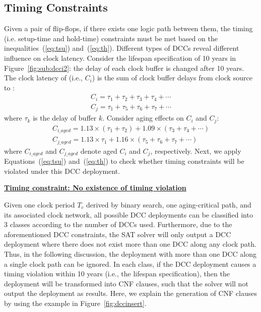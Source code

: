 \subsection{Timing Constraints}
\label{subsec:tccc}
Given a pair of flip-flops, if there exists one logic path between them, the timing (i.e. setup-time and hold-time) constraints must be met based on the inequalities~(\ref{eq:tsu}) and~(\ref{eq:th}). Different types of DCCs reveal different influence on clock latency. Consider the lifespan specification of 10 years in Figure~\ref{fig:sub:dcci2}: the delay of each clock buffer is changed after 10 years. The clock latency of  (i.e., $C_i$) is the sum of clock buffer delays from clock source to : 
\begin{gather*}
C_i = \tau_1 + \tau_2 + \tau_3 + \tau_4 +\dotsb \\
C_j = \tau_1 + \tau_5 + \tau_6 + \tau_7 +\dotsb
\end{gather*}
where $\tau_k$ is the delay of buffer $k$. Consider aging effects on $C_i$ and $C_j$: 
\begin{gather*}
C_{i\_aged} = 1.13 \times \left(\tau_1 + \tau_2\right) + 1.09 \times \left(\tau_3 + \tau_4 + \dotsb\right)\\
C_{j\_aged} = 1.13 \times \tau_1+ 1.16 \times \left( \tau_5 + \tau_6 + \tau_7 + \dotsb \right)
\end{gather*}
where $C_{i\_aged}$ and $C_{j\_aged}$ denote aged $C_i$ and $C_j$, respectively. Next, we apply Equations~(\ref{eq:tsu}) and~(\ref{eq:th}) to check whether timing constraints will be violated under this DCC deployment.

\noindent \textbf{\uline{Timing constraint: No existence of timing violation}}

Given one clock period $T_c$ derived by binary search, one aging-critical path, and its associated clock network, all possible DCC deployments can be classified into 3 classes according to the number of DCCs used. Furthermore, due to the aforementioned DCC constraints, the SAT solver will only output a DCC deployment where there does not exist more than one DCC along any clock path. Thus, in the following discussion, the deployment with more than one DCC along a single clock path can be ignored. In each class, if the DCC deployment causes a timing violation within 10 years (i.e., the lifespan specification), then the deployment will be transformed into CNF clauses, such that the solver will not output the deployment as results. Here, we explain the generation of CNF clauses by using the example in Figure~\ref{fig:dccinsert}.


